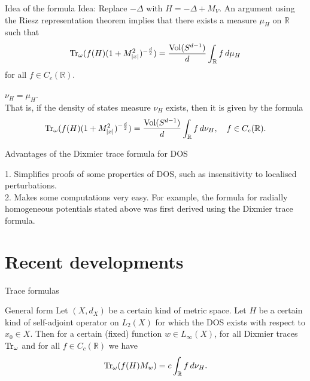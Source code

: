 \documentclass{beamer}
\numberwithin{equation}{section}
\theoremstyle{plain}
\theoremstyle{plain}
\theoremstyle{definition}
\theoremstyle{plain}
\theoremstyle{plain}
\theoremstyle{definition}
\newcommand{\tr}{{\rm Tr}}
\newcommand{\Vol}{\mathrm{Vol}}
\newcommand{\Rl}{\mathbb{R}}
\begin{document}
\begin{frame}{Idea of the formula}
    Idea: Replace $-\Delta$ with $H = -\Delta+M_V$. An argument using the Riesz representation theorem implies that there exists a measure $\mu_H$ on $\Rl$ such that 
    $$
        \tr_{\omega}(f(H)(1+M_{|x|}^2)^{-\frac{d}{2}}) = \frac{\Vol(S^{d-1})}{d}\int_{\Rl} f\,d\mu_H
    $$
    for all $f \in C_c(\Rl).$\\
    
    \begin{theorem}
        $\nu_H = \mu_H$.\\
        
        That is, if the density of states measure $\nu_H$ exists, then it is given by the formula
        $$
            \tr_{\omega}(f(H)(1+M_{|x|}^2)^{-\frac{d}{2}}) = \frac{\Vol(S^{d-1})}{d}\int_{\Rl} f\,d\nu_H,\quad f \in C_c(\Rl).
        $$
    \end{theorem}
\end{frame} 


\begin{frame}{Advantages of the Dixmier trace formula for DOS}

1. Simplifies proofs of some properties of DOS, such as insensitivity to localised perturbations.\\

2. Makes some computations very easy. For example, the formula for radially homogeneous potentials stated above was first derived using the Dixmier trace formula.
\end{frame}


\section{Recent developments}

\begin{frame}{Trace formulas}
    \begin{block}{General form}
    Let $(X, d_X)$ be a certain kind of metric space. Let $H$ be a certain kind of self-adjoint operator on $L_2(X)$ for which the DOS exists with respect to $x_0 \in X$. Then for a certain (fixed) function $w\in L_\infty(X)$, for all Dixmier traces $\tr_\omega$ and for all $f \in C_c(\mathbb{R})$ we have
\begin{equation*}\label{F: DOS integral}
    \tr_\omega(f(H)M_w) = c\int_{\mathbb{R}} f\,d\nu_H.
\end{equation*}
    \end{block}

\end{frame}
\end{document}
